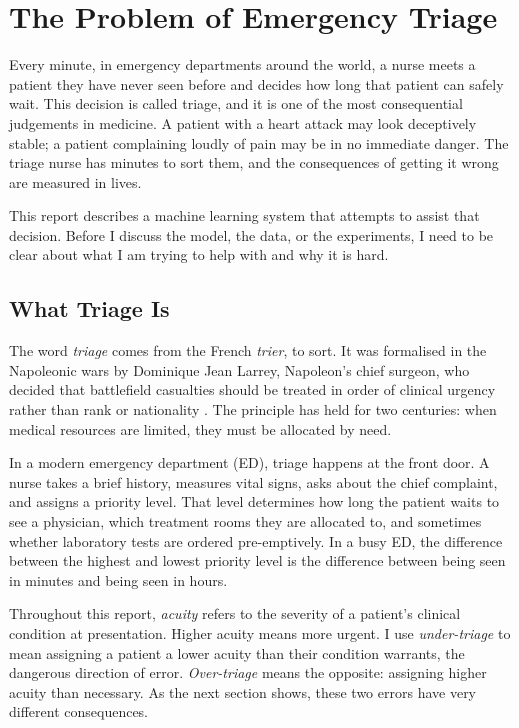 
\chapter{The Problem of Emergency Triage}
\label{ch:triage-problem}

Every minute, in emergency departments around the world, a nurse meets a patient they have never seen before and decides how long that patient can safely wait. This decision is called triage, and it is one of the most consequential judgements in medicine. A patient with a heart attack may look deceptively stable; a patient complaining loudly of pain may be in no immediate danger. The triage nurse has minutes to sort them, and the consequences of getting it wrong are measured in lives.

This report describes a machine learning system that attempts to assist that decision. Before I discuss the model, the data, or the experiments, I need to be clear about what I am trying to help with and why it is hard.

\section{What Triage Is}

The word \emph{triage} comes from the French \emph{trier}, to sort. It was formalised in the Napoleonic wars by Dominique Jean Larrey, Napoleon's chief surgeon, who decided that battlefield casualties should be treated in order of clinical urgency rather than rank or nationality \citep{nakao2017trauma}. The principle has held for two centuries: when medical resources are limited, they must be allocated by need.

In a modern emergency department (ED), triage happens at the front door. A nurse takes a brief history, measures vital signs, asks about the chief complaint, and assigns a priority level. That level determines how long the patient waits to see a physician, which treatment rooms they are allocated to, and sometimes whether laboratory tests are ordered pre-emptively. In a busy ED, the difference between the highest and lowest priority level is the difference between being seen in minutes and being seen in hours.

\begin{notebox}
Throughout this report, \emph{acuity} refers to the severity of a patient's clinical condition at presentation. Higher acuity means more urgent. I use \emph{under-triage} to mean assigning a patient a lower acuity than their condition warrants, the dangerous direction of error. \emph{Over-triage} means the opposite: assigning higher acuity than necessary. As the next section shows, these two errors have very different consequences.
\end{notebox}

